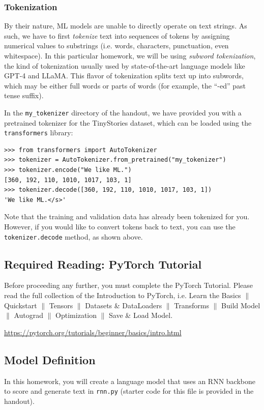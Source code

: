 \documentclass[11pt,addpoints,answers]{exam}
\begin{document}
\subsubsection{Tokenization}

By their nature, ML models are unable to directly operate on text strings. As such, we have to first \textit{tokenize} text into sequences of tokens by assigning numerical values to substrings (i.e. words, characters, punctuation, even whitespace). 
In this particular homework, we will be using \textit{subword tokenization}, the kind of tokenization usually used by state-of-the-art language models like GPT-4 and LLaMA. This flavor of tokenization splits text up into subwords, which may be either full words or parts of words (for example, the ``-ed'' past tense suffix). 

In the \texttt{my\_tokenizer} directory of the handout, we have provided you with a pretrained tokenizer for the TinyStories dataset, which can be loaded using the \texttt{transformers} library:

\begin{lstlisting}
>>> from transformers import AutoTokenizer
>>> tokenizer = AutoTokenizer.from_pretrained("my_tokenizer")
>>> tokenizer.encode("We like ML.")
[360, 192, 110, 1010, 1017, 103, 1]
>>> tokenizer.decode([360, 192, 110, 1010, 1017, 103, 1])
'We like ML.</s>'
\end{lstlisting}

Note that the training and validation data has already been tokenized for you. However, if you would like to convert tokens back to text, you can use the \texttt{tokenizer.decode} method, as shown above.


\subsection{Required Reading: PyTorch Tutorial}

Before proceeding any further, you must complete the PyTorch Tutorial. Please read the full collection of the Introduction to PyTorch, i.e. Learn the Basics $\|$ Quickstart $\|$ Tensors $\|$ Datasets \& DataLoaders $\|$ Transforms $\|$ Build Model $\|$ Autograd $\|$ Optimization $\|$ Save \& Load Model.    

    \url{https://pytorch.org/tutorials/beginner/basics/intro.html}
    

\subsection{Model Definition}\label{model}
In this homework, you will create a language model that uses an RNN backbone to score and generate text in \texttt{rnn.py} (starter code for this file is provided in the handout).
\end{document}
